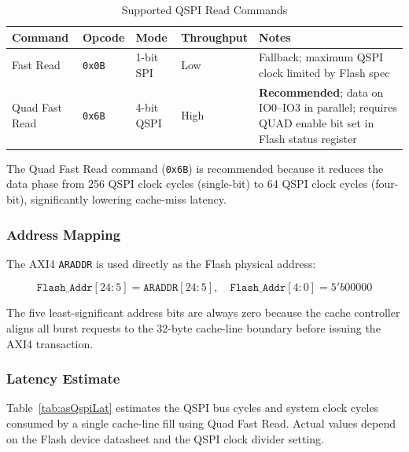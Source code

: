 \begin{table}[H]
\caption{Supported QSPI Read Commands}
\label{tab:asQspiCmd}
\centering
\begin{tabularx}{\textwidth}{|l |l |l |l |X|}
  \hline
  Command & Opcode & Mode & Throughput & Notes \\
  \hline
  \hline
  Fast Read        & \texttt{0x0B} & 1-bit SPI  & Low    &
    Fallback; maximum QSPI clock limited by Flash spec \\
  \hline
  Quad Fast Read   & \texttt{0x6B} & 4-bit QSPI & High   &
    \textbf{Recommended}; data on IO0--IO3 in parallel;
    requires QUAD enable bit set in Flash status register \\
  \hline
\end{tabularx}
\end{table}

The Quad Fast Read command (\texttt{0x6B}) is recommended because it
reduces the data phase from 256 QSPI clock cycles (single-bit) to
64 QSPI clock cycles (four-bit), significantly lowering cache-miss
latency.

\subsubsection{Address Mapping}

The AXI4 \texttt{ARADDR} is used directly as the Flash physical address:

\[
  \texttt{Flash\_Addr}[24:5] = \texttt{ARADDR}[24:5], \quad
  \texttt{Flash\_Addr}[4:0] = 5'b00000
\]

The five least-significant address bits are always zero because the
cache controller aligns all burst requests to the 32-byte cache-line
boundary before issuing the AXI4 transaction.

\subsubsection{Latency Estimate}

Table~\ref{tab:asQspiLat} estimates the QSPI bus cycles and system
clock cycles consumed by a single cache-line fill using Quad Fast Read.
Actual values depend on the Flash device datasheet and the QSPI clock
divider setting.

